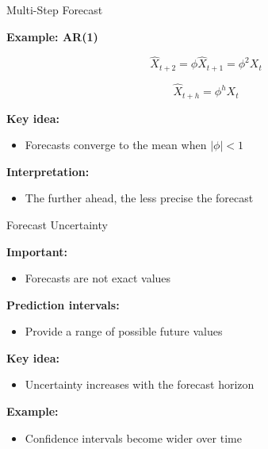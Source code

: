 \documentclass[aspectratio=169]{beamer}
\begin{document}
\begin{frame}{Multi-Step Forecast}

\textbf{Example: AR(1)}

\[
\hat{X}_{t+2} = \phi \hat{X}_{t+1} = \phi^2 X_t
\]

\[
\hat{X}_{t+h} = \phi^h X_t
\]

\vspace{0.4cm}

\textbf{Key idea:}
\begin{itemize}
    \item Forecasts converge to the mean when $|\phi|<1$
\end{itemize}

\vspace{0.4cm}

\textbf{Interpretation:}
\begin{itemize}
    \item The further ahead, the less precise the forecast
\end{itemize}

\end{frame}

\begin{frame}{Forecast Uncertainty}

\textbf{Important:}
\begin{itemize}
    \item Forecasts are not exact values
\end{itemize}

\vspace{0.4cm}

\textbf{Prediction intervals:}
\begin{itemize}
    \item Provide a range of possible future values
\end{itemize}

\vspace{0.4cm}

\textbf{Key idea:}
\begin{itemize}
    \item Uncertainty increases with the forecast horizon
\end{itemize}

\vspace{0.4cm}

\textbf{Example:}
\begin{itemize}
    \item Confidence intervals become wider over time
\end{itemize}

\end{frame}
\end{document}
